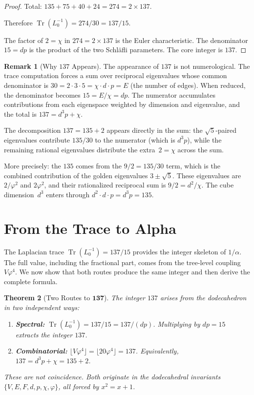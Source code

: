 \documentclass[11pt,a4paper]{article}
\theoremstyle{plain}
\newtheorem{theorem}{Theorem}[section]
\theoremstyle{definition}
\newtheorem{remark}[theorem]{Remark}
\newcommand{\vp}{\varphi}
\DeclareMathOperator{\Tr}{Tr}
\begin{document}
\begin{proof}
Total: $135 + 75 + 40 + 24 = 274 = 2 \times 137$.

Therefore $\Tr(L_0^{-1}) = 274/30 = 137/15$.  \checkmark

The factor of $2 = \chi$ in $274 = 2 \times 137$ is the Euler
characteristic.  The denominator $15 = dp$ is the product of the
two Schl\"afli parameters.  The core integer is $137$.
\end{proof}

\begin{remark}[Why $137$ Appears]\label{rem:137-structure}
The appearance of $137$ is not numerological.  The trace computation
forces a sum over reciprocal eigenvalues whose common denominator
is $30 = 2 \cdot 3 \cdot 5 = \chi \cdot d \cdot p = E$ (the number
of edges).  When reduced, the denominator becomes $15 = E/\chi = dp$.
The numerator accumulates contributions from each eigenspace weighted
by dimension and eigenvalue, and the total is $137 = d^3 p + \chi$.

The decomposition $137 = 135 + 2$ appears directly in the sum:
the $\sqrt{5}$-paired eigenvalues contribute $135/30$ to the
numerator (which is $d^3 p$), while the remaining rational eigenvalues
distribute the extra~$2 = \chi$ across the sum.

More precisely: the $135$ comes from the $9/2 = 135/30$ term, which
is the combined contribution of the golden eigenvalues $3 \pm \sqrt{5}$.
These eigenvalues are $2/\vp^2$ and $2\vp^2$, and their rationalized
reciprocal sum is $9/2 = d^2/\chi$.  The cube dimension~$d^3$ enters
through $d^2 \cdot d \cdot p = d^3 p = 135$.
\end{remark}

\section{From the Trace to Alpha}\label{sec:alpha}

The Laplacian trace $\Tr(L_0^{-1}) = 137/15$ provides the integer skeleton
of $1/\alpha$.  The full value, including the fractional part, comes from
the tree-level coupling $V\vp^4$.  We now show that both routes produce
the same integer and then derive the complete formula.

\begin{theorem}[Two Routes to $\mathbf{137}$]\label{thm:two-routes}
The integer $137$ arises from the dodecahedron in two independent ways:
\begin{enumerate}
  \item \textbf{Spectral:} $\Tr(L_0^{-1}) = 137/15 = 137/(dp)$.
    Multiplying by $dp = 15$ extracts the integer $137$.
  \item \textbf{Combinatorial:} $\lfloor V\vp^4 \rfloor = \lfloor 20\vp^4 \rfloor = 137$.
    Equivalently, $137 = d^3 p + \chi = 135 + 2$.
\end{enumerate}
These are not coincidence.  Both originate in the dodecahedral
invariants $\{V, E, F, d, p, \chi, \vp\}$, all forced by $x^2 = x + 1$.
\end{theorem}
\end{document}
